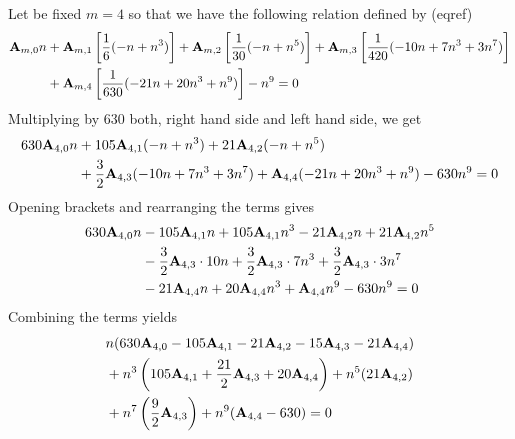 \begin{examp}
    Let be fixed $m=4$ so that we have the following relation defined by (eqref)
    \begin{equation*}
        \begin{split}
            {\mathbf{A}} \sb{m,0} n
            &+ {\mathbf{A}} \sb{m,1} \left[ \frac{1}{6} (-n + n^3) \right]
            + {\mathbf{A}} \sb{m,2} \left[ \frac{1}{30} (-n + n^5) \right]
            + {\mathbf{A}} \sb{m,3} \left[ \frac{1}{420} (-10 n + 7 n^3 + 3 n^7) \right] \\
            &+ {\mathbf{A}} \sb{m,4} \left[ \frac{1}{630} (-21 n + 20 n^3 + n^9) \right] - n^9 = 0
        \end{split}
    \end{equation*}
    Multiplying by $630$ both, right hand side and left hand side, we get
    \begin{equation*}
        \begin{split}
            630 {\mathbf{A}} \sb{4,0} n
            &+ 105 {\mathbf{A}} \sb{4,1} (-n + n^3) + 21 {\mathbf{A}} \sb{4,2} (-n + n^5) \\
            &+ \frac{3}{2} {\mathbf{A}} \sb{4,3} (-10 n + 7 n^3 + 3 n^7) + {\mathbf{A}} \sb{4,4} (-21 n + 20 n^3 + n^9) - 630 n^9 = 0
        \end{split}
    \end{equation*}
    Opening brackets and rearranging the terms gives
    \begin{equation*}
        \begin{split}
            630 {\mathbf{A}} \sb{4,0} n
            &- 105 {\mathbf{A}} \sb{4,1} n + 105 {\mathbf{A}} \sb{4,1} n ^3 - 21 {\mathbf{A}} \sb{4,2} n + 21 {\mathbf{A}} \sb{4,2} n^5 \\
            &- \frac{3}{2} {\mathbf{A}} \sb{4,3} \cdot 10n + \frac{3}{2} {\mathbf{A}} \sb{4,3} \cdot 7n^3 + \frac{3}{2} {\mathbf{A}} \sb{4,3} \cdot 3n^7 \\
            &-21 {\mathbf{A}} \sb{4,4} n + 20 {\mathbf{A}} \sb{4,4} n^3 + {\mathbf{A}} \sb{4,4} n ^9 - 630 n^9 = 0
        \end{split}
    \end{equation*}
    Combining the terms yields
    \begin{equation*}
        \begin{split}
            &n (630 \coeffA{4}{0} - 105 \coeffA{4}{1} - 21 \coeffA{4}{2} - 15 \coeffA{4}{3} - 21 \coeffA{4}{4})  \\
            &+ n^3 \left( 105 \coeffA{4}{1} + \frac{21}{2} \coeffA{4}{3} + 20 \coeffA{4}{4} \right) + n^5 (21 \coeffA{4}{2}) \\
            &+ n^7 \left( \frac{9}{2} \coeffA{4}{3} \right) + n^9 (\coeffA{4}{4} - 630) = 0

\end{split}
\end{equation*}
\end{examp}
